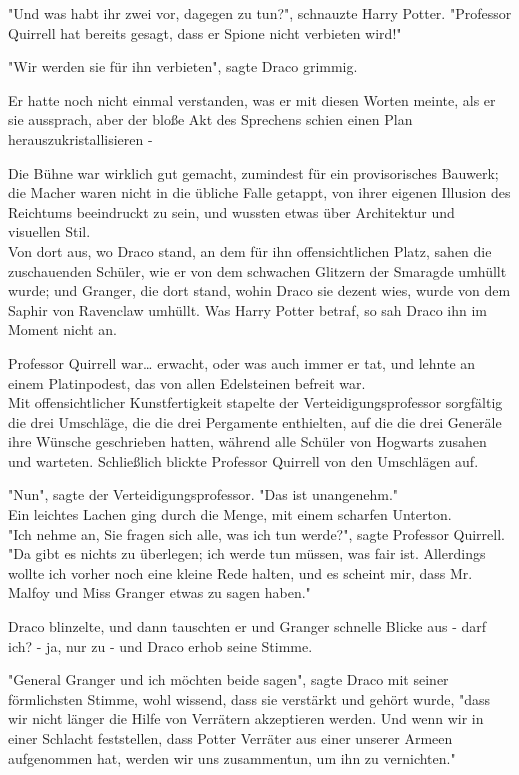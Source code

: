 {"Und was habt ihr zwei vor, dagegen zu tun?", schnauzte Harry Potter. "Professor Quirrell hat bereits gesagt, dass er Spione nicht verbieten wird!"

"Wir werden sie für ihn verbieten", sagte Draco grimmig.

Er hatte noch nicht einmal verstanden, was er mit diesen Worten meinte, als er sie aussprach, aber der bloße Akt des Sprechens schien einen Plan herauszukristallisieren -

Die Bühne war wirklich gut gemacht, zumindest für ein provisorisches Bauwerk; die Macher waren nicht in die übliche Falle getappt, von ihrer eigenen Illusion des Reichtums beeindruckt zu sein, und wussten etwas über Architektur und visuellen Stil.\\ Von dort aus, wo Draco stand, an dem für ihn offensichtlichen Platz, sahen die zuschauenden Schüler, wie er von dem schwachen Glitzern der Smaragde umhüllt wurde; und Granger, die dort stand, wohin Draco sie dezent wies, wurde von dem Saphir von Ravenclaw umhüllt. Was Harry Potter betraf, so sah Draco ihn im Moment nicht an.

Professor Quirrell war… erwacht, oder was auch immer er tat, und lehnte an einem Platinpodest, das von allen Edelsteinen befreit war.\\ Mit offensichtlicher Kunstfertigkeit stapelte der Verteidigungsprofessor sorgfältig die drei Umschläge, die die drei Pergamente enthielten, auf die die drei Generäle ihre Wünsche geschrieben hatten, während alle Schüler von Hogwarts zusahen und warteten. Schließlich blickte Professor Quirrell von den Umschlägen auf.

"Nun", sagte der Verteidigungsprofessor. "Das ist unangenehm."\\ Ein leichtes Lachen ging durch die Menge, mit einem scharfen Unterton.\\ "Ich nehme an, Sie fragen sich alle, was ich tun werde?", sagte Professor Quirrell.\\ "Da gibt es nichts zu überlegen; ich werde tun müssen, was fair ist. Allerdings wollte ich vorher noch eine kleine Rede halten, und es scheint mir, dass Mr. Malfoy und Miss Granger etwas zu sagen haben."

Draco blinzelte, und dann tauschten er und Granger schnelle Blicke aus - darf ich? - ja, nur zu - und Draco erhob seine Stimme.

"General Granger und ich möchten beide sagen", sagte Draco mit seiner förmlichsten Stimme, wohl wissend, dass sie verstärkt und gehört wurde, "dass wir nicht länger die Hilfe von Verrätern akzeptieren werden. Und wenn wir in einer Schlacht feststellen, dass Potter Verräter aus einer unserer Armeen aufgenommen hat, werden wir uns zusammentun, um ihn zu vernichten."

}
